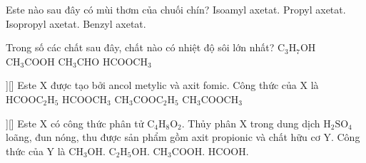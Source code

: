 \begin{ex}[1][][]
	Este nào sau đây có mùi thơm của chuối chín?
	\choice
	{%
		\True Isoamyl axetat.
	}
	{%
			Propyl axetat.
	}
	{%
		Isopropyl axetat.
	}
	{%
		Benzyl axetat.
	}

	\sodongkeex[4]
\end{ex}
\begin{ex}[2][][]
	Trong số các chất sau đây, chất nào có nhiệt độ sôi lớn nhất?
	\choice
	{%
		$\mathrm{C}_3 \mathrm{H}_7 \mathrm{OH}$
	}
	{%
		\True $\mathrm{CH}_3 \mathrm{COOH}$
	}
	{%
		$\mathrm{CH}_3 \mathrm{CHO}$
	}
	{%
		$\mathrm{HCOOCH}_3$
	}
	
	\sodongkeex[4]
\end{ex}

\begin{ex}[2][[QG.21 - 204]][]
	Este $\mathrm{X}$ được tạo bởi ancol metylic và axit fomic. Công thức của $\mathrm{X}$ là
	\choice
	{%
		$\mathrm{HCOOC}_2 \mathrm{H}_5$
	}
	{%
		\True $\mathrm{HCOOCH}_3$
	}
	{%
		$\mathrm{CH}_3 \mathrm{COOC}_2 \mathrm{H}_5$
	}
	{%
		$\mathrm{CH}_3 \mathrm{COOCH}_3$
	}
	
	\sodongkeex[4]
\end{ex}

\begin{ex}[2][[QG.21 - 201]][]
	Este $\mathrm{X}$ có công thức phân tử $\mathrm{C}_4 \mathrm{H}_8 \mathrm{O}_2$. Thủy phân $\mathrm{X}$ trong dung dịch $\mathrm{H}_2 \mathrm{SO}_4$ loãng, đun nóng, thu được sản phẩm gồm axit propionic và chất hữu cơ $\mathrm{Y}$. Công thức của $\mathrm{Y}$ là
	\choice
	{%
		\True $\mathrm{CH}_3 \mathrm{OH}$.
	}
	{%
		$\mathrm{C}_2 \mathrm{H}_5 \mathrm{OH}$.
	}
	{%
		$\mathrm{CH}_3 \mathrm{COOH}$.
	}
	{%
		$\mathrm{HCOOH}$.
	}
	
	\sodongkeex[4]
\end{ex}


